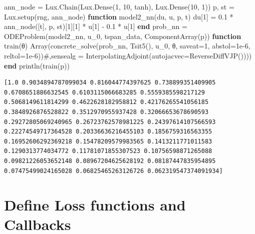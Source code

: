 \documentclass[
  letterpaper,
  DIV=11,
  numbers=noendperiod]{scrreport}
\newenvironment{Shaded}{\begin{snugshade}}{\end{snugshade}}
\newcommand{\CommentTok}[1]{\textcolor[rgb]{0.37,0.37,0.37}{#1}}
\newcommand{\FloatTok}[1]{\textcolor[rgb]{0.68,0.00,0.00}{#1}}
\newcommand{\FunctionTok}[1]{\textcolor[rgb]{0.28,0.35,0.67}{#1}}
\newcommand{\KeywordTok}[1]{\textcolor[rgb]{0.00,0.23,0.31}{\textbf{#1}}}
\newcommand{\NormalTok}[1]{\textcolor[rgb]{0.00,0.23,0.31}{#1}}
\newcommand{\OperatorTok}[1]{\textcolor[rgb]{0.37,0.37,0.37}{#1}}
\begin{document}
\begin{Shaded}
\begin{Highlighting}[]
\NormalTok{ann\_node }\OperatorTok{=}\NormalTok{ Lux.}\FunctionTok{Chain}\NormalTok{(Lux.}\FunctionTok{Dense}\NormalTok{(}\FloatTok{1}\NormalTok{, }\FloatTok{10}\NormalTok{, tanh), Lux.}\FunctionTok{Dense}\NormalTok{(}\FloatTok{10}\NormalTok{, }\FloatTok{1}\NormalTok{))}
\NormalTok{p, st }\OperatorTok{=}\NormalTok{ Lux.}\FunctionTok{setup}\NormalTok{(rng, ann\_node)}
\KeywordTok{function} \FunctionTok{model2\_nn}\NormalTok{(du, u, p, t)}
\NormalTok{    du[}\FloatTok{1}\NormalTok{] }\OperatorTok{=} \FloatTok{0.1} \OperatorTok{*} \FunctionTok{ann\_node}\NormalTok{([t], p, st)[}\FloatTok{1}\NormalTok{][}\FloatTok{1}\NormalTok{] }\OperatorTok{*}\NormalTok{ u[}\FloatTok{1}\NormalTok{] }\OperatorTok{{-}} \FloatTok{0.1} \OperatorTok{*}\NormalTok{ u[}\FloatTok{1}\NormalTok{]}
\KeywordTok{end}
\NormalTok{prob\_nn }\OperatorTok{=} \FunctionTok{ODEProblem}\NormalTok{(model2\_nn, u\_0, tspan\_data, }\FunctionTok{ComponentArray}\NormalTok{(p))}
\KeywordTok{function} \FunctionTok{train}\NormalTok{(θ)}
    \FunctionTok{Array}\NormalTok{(}\FunctionTok{concrete\_solve}\NormalTok{(prob\_nn, }\FunctionTok{Tsit5}\NormalTok{(), u\_0, θ, saveat}\OperatorTok{=}\FloatTok{1}\NormalTok{,}
\NormalTok{        abstol}\OperatorTok{=}\FloatTok{1e{-}6}\NormalTok{, reltol}\OperatorTok{=}\FloatTok{1e{-}6}\NormalTok{))}\CommentTok{\#,sensealg = InterpolatingAdjoint(autojacvec=ReverseDiffVJP())))}
\KeywordTok{end}
\FunctionTok{println}\NormalTok{(}\FunctionTok{train}\NormalTok{(p))}
\end{Highlighting}
\end{Shaded}

\begin{verbatim}
[1.0 0.9034894787099034 0.816044774397625 0.738899351409905 0.6708651886632545 0.6103115066683285 0.5559385598217129 0.5068149611814299 0.4622628182958812 0.42176265541056185 0.3848926876528822 0.3512970955937428 0.32066653678690593 0.29272805069240965 0.26723762578981225 0.24397614107566593 0.22274549717364528 0.20336636216455103 0.1856759316563355 0.16952606292369218 0.15478209579983565 0.1413211771011583 0.1290313774034772 0.11781071855307523 0.10756598871265088 0.09821226053652148 0.08967204625628192 0.08187447835954895 0.07475499024165028 0.06825465263126726 0.062319547374091934]
\end{verbatim}

\section{Define Loss functions and
Callbacks}\label{define-loss-functions-and-callbacks}
\end{document}
